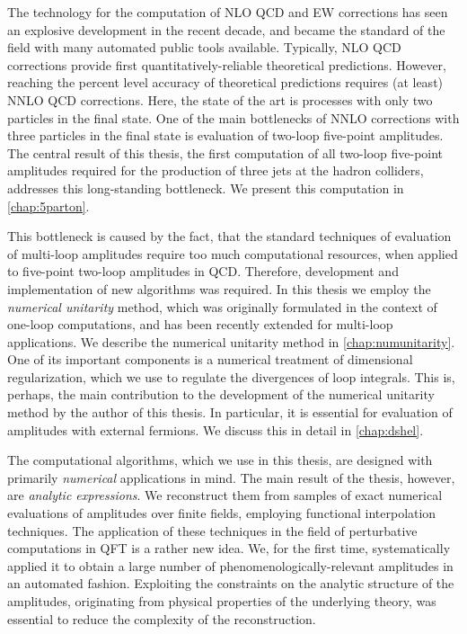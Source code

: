 The technology for the computation of NLO QCD and EW corrections has seen an explosive development
in the recent decade, and became the standard of the field with many automated public tools available.
Typically, NLO QCD corrections provide first quantitatively-reliable theoretical predictions.
However, reaching the percent level accuracy of theoretical predictions requires (at least) NNLO QCD corrections.
Here, the state of the art is processes with only two particles in the final state.
One of the main bottlenecks of NNLO corrections with three particles in the final state is evaluation of two-loop five-point amplitudes.
The central result of this thesis, the first computation of all two-loop five-point amplitudes required for the production
of three jets at the hadron colliders, addresses this long-standing bottleneck. We present this computation in  \cref{chap:5parton}.

This bottleneck is caused by the fact,
that the standard techniques of evaluation of multi-loop amplitudes require too much computational resources,
when applied to five-point two-loop amplitudes in QCD.
Therefore, development and implementation of new algorithms was required.
In this thesis we employ the \emph{numerical unitarity} method, which
was originally formulated in the context of one-loop computations,
and has been recently extended for multi-loop applications.
We describe the numerical unitarity method in \cref{chap:numunitarity}.
One of its important components is a numerical treatment of dimensional regularization, which we use to regulate the divergences of loop integrals.
This is, perhaps, the main contribution to the development of the numerical unitarity method by the author of this thesis.
In particular, it is essential for evaluation of amplitudes with external fermions.
We discuss this in detail in \cref{chap:dshel}.

The computational algorithms, which we use in this thesis, are designed with primarily \emph{numerical} applications in mind.
The main result of the thesis, however, are \emph{analytic expressions}.
We reconstruct them from samples of exact numerical evaluations of amplitudes over finite fields,
employing functional interpolation techniques.
The application of these techniques in the field of perturbative computations in QFT is a rather new idea.
We, for the first time, systematically applied it to obtain a large number of phenomenologically-relevant amplitudes in an automated fashion. 
Exploiting the constraints on the analytic structure of the amplitudes, originating
from physical properties of the underlying theory, was essential to reduce the complexity of the reconstruction.

